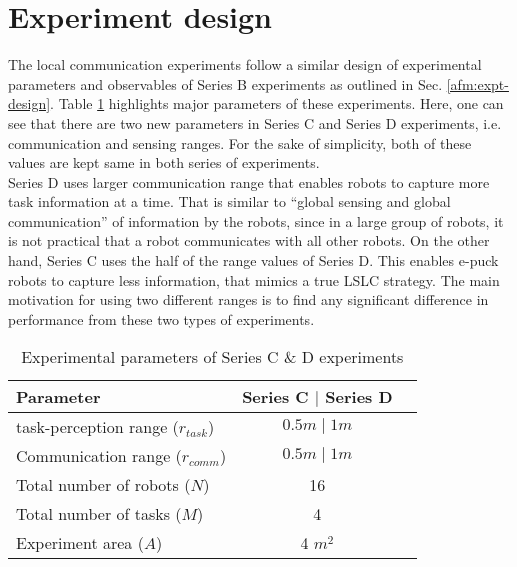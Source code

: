 \section{Experiment design}
\label{local-comm:expt-design}
%
The local communication experiments follow a similar design of experimental parameters and observables of Series B experiments as outlined in Sec. \ref{afm:expt-design}. Table \ref{table:expt-design} highlights  major parameters of these experiments. Here, one can see that there are two new parameters in Series C and Series D experiments, i.e. communication and sensing ranges. For the sake of simplicity, both of these values are kept same in both series of experiments.\\
Series D uses larger communication range that enables robots to capture more task information at a time. That is similar to  ``global sensing and global communication'' of information by the robots, since in a large group of robots, it is not practical that a robot communicates with all other robots. On the other hand, Series C uses the half of the range values of Series D. This enables e-puck robots to capture less information, that mimics a true LSLC strategy. The main motivation for using two different ranges is to find any significant difference in performance from these two types of experiments.
\begin{table}
\caption{Experimental parameters of Series C \& D experiments}
\label{table:expt-design}
\begin{center}
\begin{tabular}{|l|c|c|}
\hline Parameter & \hspace*{0.2cm} Series C $\mid$ Series D\\
\hline task-perception range ($r_{task}$) & $0.5 m \mid 1 m$\\
\hline Communication range ($r_{comm}$) & $0.5 m \mid 1 m$\\
\hline Total number of robots ($N$) & 16 \\
\hline Total number of tasks ($M$) & 4 \\
\hline Experiment area ($A$) & 4 $m^2$\\
\hline
\end{tabular}
\end{center}
\end{table}
